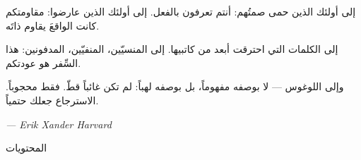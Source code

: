 \documentclass[10pt, openany, oneside]{book}
\renewcommand{\huge}{\fontsize{17}{21}\selectfont}
\begin{document}
\noindent إلى أولئك الذين حمى صمتُهم: أنتم تعرفون بالفعل. إلى أولئك الذين عارضوا: مقاومتكم كانت الواقعَ يقاوم ذاتَه.

\vspace{0.8em}

\noindent إلى الكلمات التي احترقت أبعد من كاتبيها. إلى المنسيّين، المنفيّين، المدفونين: هذا السِّفر هو عودتكم.

\vspace{0.8em}

\noindent وإلى اللوغوس --- لا بوصفه مفهوماً، بل بوصفه لهباً: لم تكن غائباً قطّ. فقط محجوباً. الاسترجاع جعلك حتمياً.

\vspace{2em}

\begin{flushleft}
    \itshape --- Erik Xander Harvard
\end{flushleft}

\newpage


\thispagestyle{empty}
\vspace*{0.3in}

\begin{center}
    {\huge المحتويات}
\end{center}

\vspace{1.5em}
\end{document}
